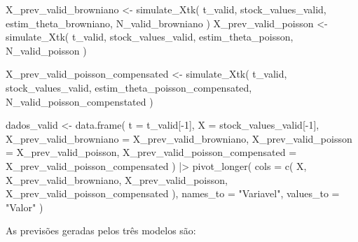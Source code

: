 \documentclass[
  letterpaper,
  DIV=11,
  numbers=noendperiod]{scrreprt}
\newenvironment{Shaded}{\begin{snugshade}}{\end{snugshade}}
\newcommand{\AttributeTok}[1]{\textcolor[rgb]{0.40,0.45,0.13}{#1}}
\newcommand{\DecValTok}[1]{\textcolor[rgb]{0.68,0.00,0.00}{#1}}
\newcommand{\FunctionTok}[1]{\textcolor[rgb]{0.28,0.35,0.67}{#1}}
\newcommand{\NormalTok}[1]{\textcolor[rgb]{0.00,0.23,0.31}{#1}}
\newcommand{\OtherTok}[1]{\textcolor[rgb]{0.00,0.23,0.31}{#1}}
\newcommand{\SpecialCharTok}[1]{\textcolor[rgb]{0.37,0.37,0.37}{#1}}
\newcommand{\StringTok}[1]{\textcolor[rgb]{0.13,0.47,0.30}{#1}}
\begin{document}
\begin{Shaded}
\begin{Highlighting}[]
\NormalTok{X\_prev\_valid\_browniano }\OtherTok{\textless{}{-}} \FunctionTok{simulate\_Xtk}\NormalTok{(}
\NormalTok{    t\_valid,}
\NormalTok{    stock\_values\_valid,}
\NormalTok{    estim\_theta\_browniano,}
\NormalTok{    N\_valid\_browniano}
\NormalTok{)}
\NormalTok{X\_prev\_valid\_poisson }\OtherTok{\textless{}{-}} \FunctionTok{simulate\_Xtk}\NormalTok{(}
\NormalTok{    t\_valid,}
\NormalTok{    stock\_values\_valid,}
\NormalTok{    estim\_theta\_poisson,}
\NormalTok{    N\_valid\_poisson}
\NormalTok{)}

\NormalTok{X\_prev\_valid\_poisson\_compensated }\OtherTok{\textless{}{-}}
    \FunctionTok{simulate\_Xtk}\NormalTok{(}
\NormalTok{        t\_valid,}
\NormalTok{        stock\_values\_valid,}
\NormalTok{        estim\_theta\_poisson\_compensated,}
\NormalTok{        N\_valid\_poisson\_compenstated}
\NormalTok{    )}

\NormalTok{dados\_valid }\OtherTok{\textless{}{-}} \FunctionTok{data.frame}\NormalTok{(}
    \AttributeTok{t =}\NormalTok{ t\_valid[}\SpecialCharTok{{-}}\DecValTok{1}\NormalTok{],}
    \AttributeTok{X =}\NormalTok{ stock\_values\_valid[}\SpecialCharTok{{-}}\DecValTok{1}\NormalTok{],}
    \AttributeTok{X\_prev\_valid\_browniano =}\NormalTok{ X\_prev\_valid\_browniano,}
    \AttributeTok{X\_prev\_valid\_poisson =}\NormalTok{ X\_prev\_valid\_poisson,}
    \AttributeTok{X\_prev\_valid\_poisson\_compensated =}\NormalTok{ X\_prev\_valid\_poisson\_compensated}
\NormalTok{) }\SpecialCharTok{|\textgreater{}}
    \FunctionTok{pivot\_longer}\NormalTok{(}
        \AttributeTok{cols =} \FunctionTok{c}\NormalTok{(}
\NormalTok{            X,}
\NormalTok{            X\_prev\_valid\_browniano,}
\NormalTok{            X\_prev\_valid\_poisson,}
\NormalTok{            X\_prev\_valid\_poisson\_compensated}
\NormalTok{        ),}
        \AttributeTok{names\_to =} \StringTok{"Variavel"}\NormalTok{,}
        \AttributeTok{values\_to =} \StringTok{"Valor"}
\NormalTok{    )}
\end{Highlighting}
\end{Shaded}

As previsões geradas pelos três modelos são:
\end{document}
